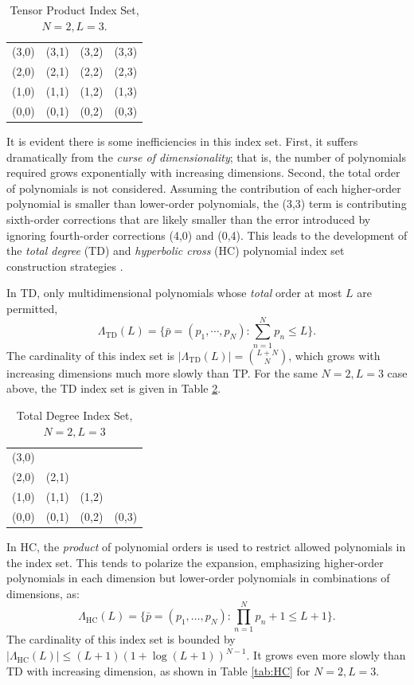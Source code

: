 \begin{table}[h]
  \centering
  \begin{tabular}{c c c c}
    (3,0) & (3,1) & (3,2) & (3,3) \\
    (2,0) & (2,1) & (2,2) & (2,3) \\
    (1,0) & (1,1) & (1,2) & (1,3) \\
    (0,0) & (0,1) & (0,2) & (0,3)
  \end{tabular}
  \caption{Tensor Product Index Set, $N=2,L=3$.}
  \label{tab:TP}
\end{table}

It is evident there is some inefficiencies in this index set.  First, it suffers dramatically from the
\emph{curse of dimensionality}; that is, the number of polynomials required grows exponentially with
increasing dimensions.  Second, the total order of polynomials is not considered.  Assuming the contribution of
each higher-order polynomial is smaller than lower-order polynomials, the (3,3) term is
contributing sixth-order corrections that are likely smaller than the error introduced by ignoring
fourth-order corrections (4,0) and (0,4).  This leads to the development of the \emph{total degree} (TD) and
\emph{hyperbolic cross} (HC) polynomial index set construction strategies \cite{hctd}.

In TD, only multidimensional polynomials whose \emph{total} order at most $L$ are permitted,
\begin{equation}
  \Lambda_\text{TD}(L)=\Big\{\bar p=(p_1,\cdots,p_N):\sum_{n=1}^N p_n \leq L
\Big\}.
\end{equation}
The cardinality of this index set is $|\Lambda_\text{TD}(L)|={L+N\choose N}$, which grows with increasing
dimensions much more slowly than TP.  For the same $N=2,L=3$ case above, the TD index set is given in Table
\ref{tab:TD}. 

\begin{table}[h]
  \centering
  \begin{tabular}{c c c c}
    (3,0) &       &       &       \\
    (2,0) & (2,1) &       &       \\
    (1,0) & (1,1) & (1,2) &       \\
    (0,0) & (0,1) & (0,2) & (0,3)
  \end{tabular}
  \caption{Total Degree Index Set, $N=2,L=3$}
  \label{tab:TD}
\end{table}

In HC, the \emph{product} of polynomial orders is used to restrict allowed polynomials in the index set.  This
tends to polarize the expansion, emphasizing higher-order polynomials in each dimension but lower-order
polynomials in combinations of dimensions, as:
\begin{equation}
  \Lambda_\text{HC}(L)=\Big\{\bar p=(p_1,\ldots,p_N):\prod_{n=1}^N p_n+1 \leq L+1
\Big\}.
\end{equation}
The cardinality of this index set is bounded by $|\Lambda_\text{HC}(L)|\leq (L+1)(1+\log(L+1))^{N-1}$. It
grows even more slowly than TD with increasing dimension, as shown in Table \ref{tab:HC} for $N=2,L=3$.

